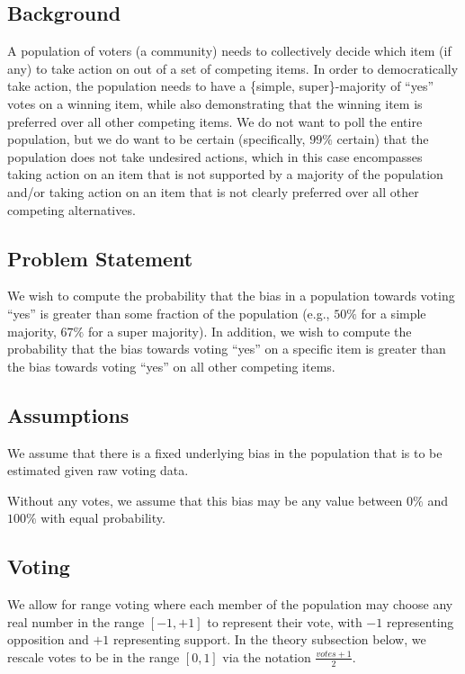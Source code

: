\documentclass[chi_draft]{sigchi}
\begin{document}

\subsection{Background}
A population of voters (a community) needs to collectively decide which item (if any) to take action on out of a set of competing items.
In order to democratically take action, the population needs to have a \{simple, super\}-majority of ``yes'' votes on a
winning item, while also demonstrating that the winning item is preferred over all other competing items.
We do not want to poll the entire population, but we do want to be certain (specifically, $99\%$ certain) that
the population does not take undesired actions, which in this case encompasses taking action on an item that is not
supported by a majority of the population and/or taking action on an item that is not clearly preferred over all
other competing alternatives.

\subsection{Problem Statement}
We wish to compute the probability that the bias in a population towards voting ``yes'' is greater than some
fraction of the population (e.g., $50\%$ for a simple majority, $67\%$ for a super majority).
In addition, we wish to compute the probability that the bias towards voting ``yes'' on a specific item is greater
than the bias towards voting ``yes'' on all other competing items.

\subsection{Assumptions}
We assume that there is a fixed underlying bias in the population that is to be estimated given raw voting data.

Without any votes, we assume that this bias may be any value between $0\%$ and $100\%$ with equal probability.

\subsection{Voting}
We allow for range voting where each member of the population may choose any real number in the range $[-1,+1]$ to
represent their vote, with $-1$ representing opposition and $+1$ representing support.
In the theory subsection below, we rescale votes to be in the range $[0,1]$ via the notation $\frac{votes + 1}{2}$.
\end{document}
